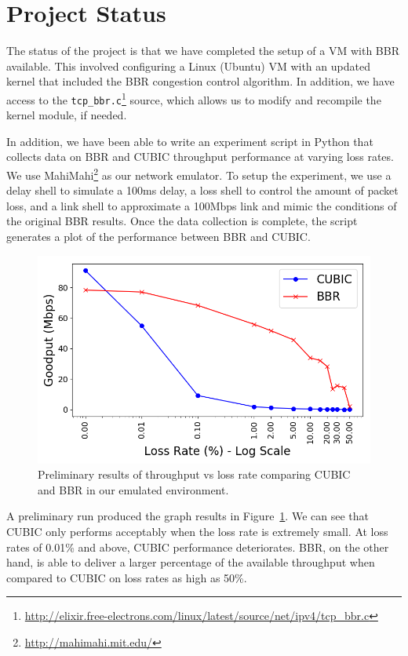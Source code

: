 
\section{Project Status}

The status of the project is that we have completed the setup of a VM with
BBR available. This involved configuring a Linux (Ubuntu) VM with an updated
kernel that included the BBR congestion control algorithm. In addition, we
have access to the \texttt{tcp\_bbr.c}\footnote{
\url{http://elixir.free-electrons.com/linux/latest/source/net/ipv4/tcp_bbr.c}}
source, which allows us to modify and recompile the kernel module, if needed.

In addition, we have been able to write an experiment script in Python that
collects data on BBR and CUBIC throughput performance at varying loss rates.
We use MahiMahi\footnote{\url{http://mahimahi.mit.edu/}} as our network
emulator. To setup the experiment, we use a delay shell to simulate a 100ms
delay, a loss shell to control the amount of packet loss, and a link
shell to approximate a 100Mbps link and mimic the conditions of the original
BBR results. Once the data collection is complete, the script generates a plot
of the performance between BBR and CUBIC.

\begin{figure}[h]
  \centering
  \includegraphics[width=1.0\columnwidth]{./img/rebbr_fig8.png}
  \caption{Preliminary results of throughput vs loss rate comparing CUBIC and BBR in our
  emulated environment.}
  \label{fig:rebbr8}
\end{figure}

A preliminary run produced the graph results in Figure~\ref{fig:rebbr8}. We
can see that CUBIC only performs acceptably when the loss rate is extremely
small. At loss rates of 0.01\% and above, CUBIC performance deteriorates.
BBR, on the other hand, is able to deliver a larger percentage of the available
throughput when compared to CUBIC on loss rates as high as 50\%.


